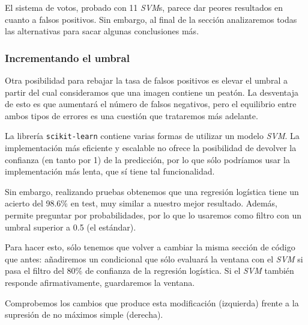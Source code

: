 \documentclass[11pt,a4paper]{article}
\begin{document}
                \par
                El sistema de votos, probado con 11 \textit{SVM}s, parece dar peores resultados en cuanto a falsos positivos. Sin embargo, al final de la sección analizaremos todas las alternativas para sacar algunas conclusiones más.

            \subsubsection{Incrementando el umbral}

                \par
                Otra posibilidad para rebajar la tasa de falsos positivos es elevar el umbral a partir del cual consideramos que una imagen contiene un peatón. La desventaja de esto es que aumentará el número de falsos negativos, pero el equilibrio entre ambos tipos de errores es una cuestión que trataremos más adelante.

                \par
                La librería \texttt{scikit-learn} contiene varias formas de utilizar un modelo \textit{SVM}. La implementación más eficiente y escalable no ofrece la posibilidad de devolver la confianza (en tanto por 1) de la predicción, por lo que sólo podríamos usar la implementación más lenta, que sí tiene tal funcionalidad.

                \par
                Sin embargo, realizando pruebas obtenemos que una regresión logística tiene un acierto del 98.6\% en test, muy similar a nuestro mejor resultado. Además, permite preguntar por probabilidades, por lo que lo usaremos como filtro con un umbral superior a 0.5 (el estándar).

                \par
                Para hacer esto, sólo tenemos que volver a cambiar la misma sección de código que antes: añadiremos un condicional que sólo evaluará la ventana con el \textit{SVM} si pasa el filtro del 80\% de confianza de la regresión logística. Si el \textit{SVM} también responde afirmativamente, guardaremos la ventana.


                \par
                Comprobemos los cambios que produce esta modificación (izquierda) frente a la supresión de no máximos simple (derecha).
\end{document}

